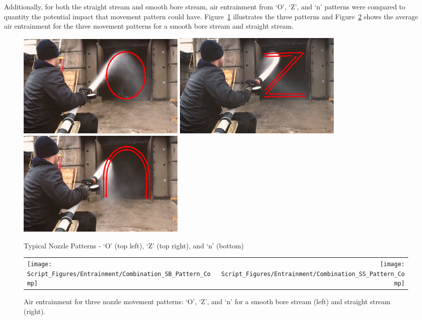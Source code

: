 \documentclass[12pt,oneside]{book}
\begin{document}
Additionally, for both the straight stream and smooth bore stream, air entrainment from `O', `Z', and `n' patterns were compared to quantity the potential impact that movement pattern could have. Figure~\ref{fig:O_Z_N_Pattern} illustrates the three patterns and Figure~\ref{fig:SS_SB_Movement_Comparison} shows the average air entrainment for the three movement patterns for a smooth bore stream and straight stream.

\begin{figure}[H]
\centering
\includegraphics[width=0.4\textwidth]{Figures/Air_Entrainment/O_Patern_Visual.png}
\includegraphics[width=0.4\textwidth]{Figures/Air_Entrainment/Z_Patern_Visual.png} \\
\includegraphics[width=0.4\textwidth]{Figures/Air_Entrainment/N_Patern_Visual.png}
\caption[Typical Nozzle Patterns]{Typical Nozzle Patterns - `O' (top left), `Z' (top right), and `n' (bottom)}
\label{fig:O_Z_N_Pattern}
\end{figure}

\begin{figure}[!ht]
\begin{tabular*}{\textwidth}{lr}
\texttt{[image: Script\_Figures/Entrainment/Combination\_SB\_Pattern\_Comp]} &
\texttt{[image: Script\_Figures/Entrainment/Combination\_SS\_Pattern\_Comp]} \\
\end{tabular*}
\caption[Air Entrainment Comparison of Movement Patterns]{Air entrainment for three nozzle movement patterns: `O', `Z', and `n' for a smooth bore stream (left) and straight stream (right).}
\label{fig:SS_SB_Movement_Comparison}
\end{figure}
\end{document}
